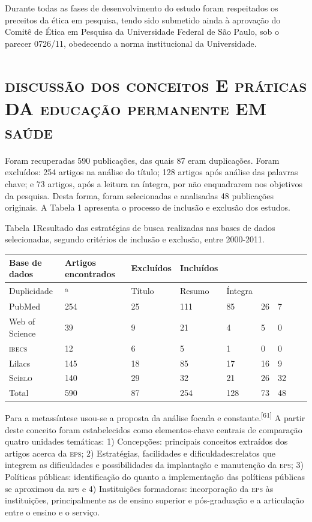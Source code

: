 \documentclass{article}
\begin{document}
Durante todas as fases de desenvolvimento do estudo foram respeitados os
preceitos da ética em pesquisa, tendo sido submetido ainda à aprovação do Comitê
de Ética em Pesquisa da Universidade Federal de São Paulo, sob o parecer
0726/11, obedecendo a norma institucional da Universidade.

\section{\textsc{discussão} \textsc{dos} \textsc{conceitos} E \textsc{práticas} DA \textsc{educação} \textsc{permanente} EM \textsc{saúde}}

Foram recuperadas 590 publicações, das quais 87 eram duplicações. Foram
excluídos: 254 artigos na análise do título; 128 artigos após análise das
palavras chave; e 73 artigos, após a leitura na íntegra, por não enquadrarem nos
objetivos da pesquisa. Desta forma, foram selecionadas e analisadas 48
publicações originais. A Tabela 1 apresenta o processo de inclusão e exclusão
dos estudos.

Tabela 1Resultado das estratégias de busca realizadas nas bases de dados
selecionadas, segundo critérios de inclusão e exclusão, entre 2000-2011.
\begin{table}
\begin{xtabular}{ l | l | l | l l | l | l | l | l }
\hline
Base de dados & Artigos encontrados & Excluídos & Incluídos\\ \hline
Duplicidade &\textsuperscript{a}
& Título & Resumo & Íntegra\\ \hline
PubMed
& 254
& 25
& 111
& 85
& 26
& 7
\\ \hline

Web of Science
& 39
& 9
& 21
& 4
& 5
& 0
\\ \hline

\textsc{ibecs}
& 12
& 6
& 5
& 1
& 0
& 0
\\ \hline

Lilacs
& 145
& 18
& 85
& 17
& 16
& 9
\\ \hline

Sci\textsc{elo}
& 140
& 29
& 32
& 21
& 26
& 32
\\ \hline

Total
& 590
& 87
& 254
& 128
& 73
& 48
\\ \hline

\end{xtabular}
\end{table}

Para a metassíntese usou-se a proposta da análise focada e constante.\textsuperscript{[}\textsuperscript{61}\textsuperscript{]}
A partir deste conceito foram estabelecidos como elementos-chave centrais de
comparação quatro unidades temáticas: 1) Concepções: principais conceitos
extraídos dos artigos acerca da \textsc{eps}; 2) Estratégias, facilidades e
dificuldades:relatos que integrem as dificuldades e possibilidades da
implantação e manutenção da \textsc{eps}; 3) Políticas públicas: identificação do quanto
a implementação das políticas públicas se aproximou da \textsc{eps} e 4) Instituições
formadoras: incorporação da \textsc{eps} às instituições, principalmente as de ensino
superior e pós-graduação e a articulação entre o ensino e o serviço.
\end{document}
